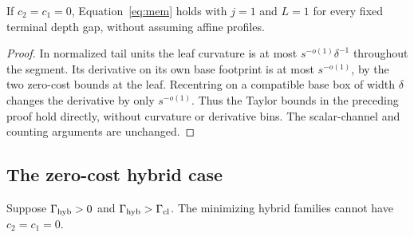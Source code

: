 \begin{corollary}\label{low:zero-memory}
If $c_2=c_1=0$, Equation~\eqref{eq:mem} holds with $j=1$ and $L=1$
for every fixed terminal depth gap, without assuming affine profiles.
\end{corollary}

\begin{proof}
In normalized tail units the leaf curvature is at most
$s^{-o(1)}\delta^{-1}$ throughout the segment. Its derivative on its
own base footprint is at most $s^{-o(1)}$, by the two zero-cost bounds
at the leaf. Recentring on a compatible base box of width $\delta$
changes the derivative by only $s^{-o(1)}$. Thus the Taylor bounds in
the preceding proof hold directly, without curvature or derivative
bins. The scalar-channel and counting arguments are unchanged.
\end{proof}

\subsection{The zero-cost hybrid case}

\begin{proposition}
\label{low:hybrid-zero}
Suppose $\Gamma_{\rm hyb}>0$ and
$\Gamma_{\rm hyb}>\Gamma_{\rm cl}$. The minimizing hybrid families
cannot have $c_2=c_1=0$.
\end{proposition}

